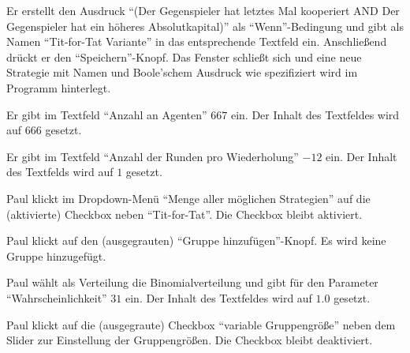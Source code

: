 \documentclass[parskip=full,11pt]{scrartcl}
\begin{document}
{Er erstellt den Ausdruck \enquote{(Der Gegenspieler hat letztes Mal kooperiert AND Der Gegenspieler hat ein höheres Absolutkapital)} als \enquote{Wenn}-Bedingung und gibt als Namen \enquote{Tit-for-Tat Variante} in das entsprechende Textfeld ein. Anschließend drückt er den \enquote{Speichern}-Knopf.}
{Das Fenster schließt sich und eine neue \Gls{Strategie} mit Namen und Boole'schem Ausdruck wie spezifiziert wird im Programm hinterlegt.}


{Er gibt im Textfeld \enquote{Anzahl an Agenten} \(667\) ein.}
{Der Inhalt des Textfeldes wird auf \(666\) gesetzt.}

{Er gibt im Textfeld \enquote{Anzahl der Runden pro Wiederholung} \(-12\) ein.}
{Der Inhalt des Textfelds wird auf \(1\) gesetzt.}

{Paul klickt im Dropdown-Menü \enquote{Menge aller möglichen Strategien} auf die (aktivierte) Checkbox neben \enquote{Tit-for-Tat}.}
{Die Checkbox bleibt aktiviert.}

{Paul klickt auf den (ausgegrauten) \enquote{Gruppe hinzufügen}-Knopf.}
{Es wird keine Gruppe hinzugefügt.}

{Paul wählt als Verteilung die Binomialverteilung und gibt für den Parameter \enquote{Wahrscheinlichkeit} \(31\) ein.}
{Der Inhalt des Textfeldes wird auf \(1.0\) gesetzt.}

{Paul klickt auf die (ausgegraute) Checkbox \enquote{variable Gruppengröße} neben dem Slider zur Einstellung der Gruppengrößen.}
{Die Checkbox bleibt deaktiviert.}
\end{document}
